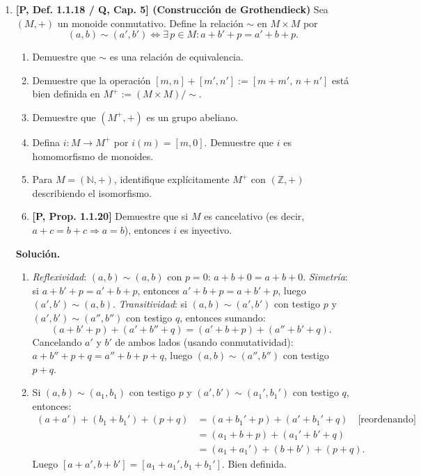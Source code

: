 \begin{enumerate}[label=\textbf{4.\arabic*.}]
\item \textbf{[P, Def. 1.1.18 / Q, Cap. 5] (Construcción de Grothendieck)}
Sea \((M, +)\) un monoide conmutativo. Define la relación \(\sim\) en
\(M \times M\) por
\[
    (a,b) \sim (a',b') \iff \exists\, p \in M : a + b' + p = a' + b + p.
\]
\begin{enumerate}[label=\alph*)]
    \item Demuestre que \(\sim\) es una relación de equivalencia.
    \item Demuestre que la operación \([m,n]+[m',n']:=[m+m',\,n+n']\)
    está bien definida en \(M^+ := (M\times M)/{\sim}\).
    \item Demuestre que \((M^+, +)\) es un grupo abeliano.
    \item Defina \(i:M \to M^+\) por \(i(m)=[m,0]\).
    Demuestre que \(i\) es homomorfismo de monoides.
    \item Para \(M=(\mathbb{N},+)\), identifique explícitamente \(M^+\) con
    \((\mathbb{Z},+)\) describiendo el isomorfismo.
    \item \textbf{[P, Prop. 1.1.20]} Demuestre que si \(M\) es cancelativo
    (es decir, \(a+c=b+c \Rightarrow a=b\)), entonces \(i\) es inyectivo.
\end{enumerate}

\textbf{Solución.}
\begin{enumerate}[label=\alph*)]
    \item \textit{Reflexividad}: \((a,b)\sim(a,b)\) con \(p=0\):
    \(a+b+0=a+b+0\). \checkmark
    \textit{Simetría}: si \(a+b'+p=a'+b+p\), entonces \(a'+b+p=a+b'+p\),
    luego \((a',b')\sim(a,b)\). \checkmark
    \textit{Transitividad}: si \((a,b)\sim(a',b')\) con testigo \(p\) y
    \((a',b')\sim(a'',b'')\) con testigo \(q\), entonces sumando:
    \[
        (a+b'+p)+(a'+b''+q) = (a'+b+p)+(a''+b'+q).
    \]
    Cancelando \(a'\) y \(b'\) de ambos lados (usando conmutatividad):
    \(a+b''+p+q = a''+b+p+q\), luego \((a,b)\sim(a'',b'')\) con testigo
    \(p+q\). \checkmark

    \item Si \((a,b)\sim(a_1,b_1)\) con testigo \(p\) y \((a',b')\sim(a_1',b_1')\)
    con testigo \(q\), entonces:
    \begin{align*}
        (a+a')+(b_1+b_1')+(p+q)
        &= (a+b_1'+p)+(a'+b_1'+q) \quad \text{[reordenando]}\\
        &= (a_1+b+p)+(a_1'+b'+q) \\
        &= (a_1+a_1')+(b+b')+(p+q).
    \end{align*}
    Luego \([a+a',b+b']=[a_1+a_1',b_1+b_1']\). Bien definida.


\end{enumerate}
\end{enumerate}
